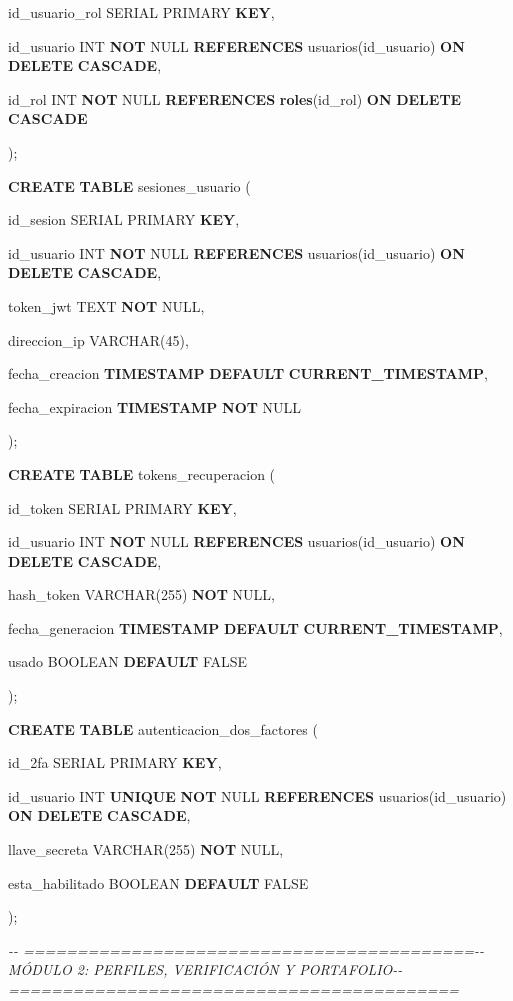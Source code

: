 \documentclass[
]{article}
\begin{document}
id\_usuario\_rol SERIAL PRIMARY \textbf{KEY},

id\_usuario INT \textbf{NOT} NULL \textbf{REFERENCES}
usuarios(id\_usuario) \textbf{ON} \textbf{DELETE} \textbf{CASCADE},

id\_rol INT \textbf{NOT} NULL \textbf{REFERENCES}
\textbf{roles}(id\_rol) \textbf{ON} \textbf{DELETE} \textbf{CASCADE}

);

\textbf{CREATE} \textbf{TABLE} sesiones\_usuario (

id\_sesion SERIAL PRIMARY \textbf{KEY},

id\_usuario INT \textbf{NOT} NULL \textbf{REFERENCES}
usuarios(id\_usuario) \textbf{ON} \textbf{DELETE} \textbf{CASCADE},

token\_jwt TEXT \textbf{NOT} NULL,

direccion\_ip VARCHAR(45),

fecha\_creacion \textbf{TIMESTAMP} \textbf{DEFAULT}
\textbf{CURRENT\_TIMESTAMP},

fecha\_expiracion \textbf{TIMESTAMP} \textbf{NOT} NULL

);

\textbf{CREATE} \textbf{TABLE} tokens\_recuperacion (

id\_token SERIAL PRIMARY \textbf{KEY},

id\_usuario INT \textbf{NOT} NULL \textbf{REFERENCES}
usuarios(id\_usuario) \textbf{ON} \textbf{DELETE} \textbf{CASCADE},

hash\_token VARCHAR(255) \textbf{NOT} NULL,

fecha\_generacion \textbf{TIMESTAMP} \textbf{DEFAULT}
\textbf{CURRENT\_TIMESTAMP},

usado BOOLEAN \textbf{DEFAULT} FALSE

);

\textbf{CREATE} \textbf{TABLE} autenticacion\_dos\_factores (

id\_2fa SERIAL PRIMARY \textbf{KEY},

id\_usuario INT \textbf{UNIQUE} \textbf{NOT} NULL \textbf{REFERENCES}
usuarios(id\_usuario) \textbf{ON} \textbf{DELETE} \textbf{CASCADE},

llave\_secreta VARCHAR(255) \textbf{NOT} NULL,

esta\_habilitado BOOLEAN \textbf{DEFAULT} FALSE

);

\emph{-\/- ==========================================-\/- MÓDULO 2:
PERFILES, VERIFICACIÓN Y PORTAFOLIO-\/-
==========================================}
\end{document}
